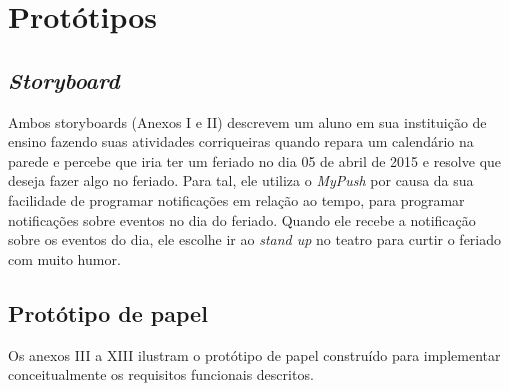 \chapter{Protótipos}

\section{\textit{Storyboard}}
  
  Ambos storyboards (Anexos I e II) descrevem um aluno em sua instituição de ensino fazendo suas atividades corriqueiras quando
  repara um calendário na parede e percebe que iria ter um feriado no dia 05 de abril de 2015 e resolve que deseja fazer algo no
  feriado. Para tal, ele utiliza o \textit{MyPush} por causa da sua facilidade de programar notificações em relação ao tempo, para programar
  notificações sobre eventos no dia do feriado. Quando ele recebe a notificação sobre os eventos do dia, ele escolhe ir ao \textit{stand up}
  no teatro para curtir o feriado com muito humor.
  
\section{Protótipo de papel}

  Os anexos III a XIII ilustram o protótipo de papel construído para implementar conceitualmente os requisitos funcionais descritos.